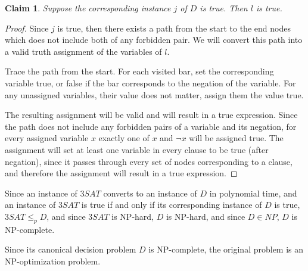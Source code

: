 \documentclass[11pt]{article}
\newtheorem{claim}{Claim}
\begin{document}
\begin{claim}
    Suppose the corresponding instance $j$ of $D$ is true. Then $l$ is true. 
\end{claim}
\begin{proof}
    Since $j$ is true, then there exists a path from the start to the end nodes which does not include both of any forbidden pair. We will convert this path into a valid truth assignment of the variables of $l$. 

    Trace the path from the start. For each visited bar, set the corresponding variable true, or false if the bar corresponds to the negation of the variable. For any unassigned variables, their value does not matter, assign them the value true.

    The resulting assignment will be valid and will result in a true expression. Since the path does not include any forbidden pairs of a variable and its negation, for every assigned variable $x$ exactly one of $x$ and $\lnot x$ will be assigned true. The assignment will set at least one variable in every clause to be true (after negation), since it passes through every set of nodes corresponding to a clause, and therefore the assignment will result in a true expression.
\end{proof}

Since an instance of $3SAT$ converts to an instance of $D$ in polynomial time, and an instance of $3SAT$ is true if and only if its corresponding instance of $D$ is true, $3SAT \leq_p D$, and since $3SAT$ is NP-hard, $D$ is NP-hard, and since $D \in NP$, $D$ is NP-complete. 

Since its canonical decision problem $D$ is NP-complete, the original problem is an NP-optimization problem.
\end{document}
